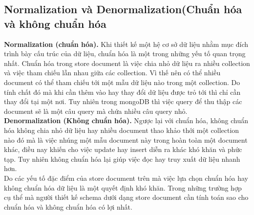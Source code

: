 \subsection{Normalization và Denormalization(Chuẩn hóa và không chuẩn hóa}
\textbf{Normalization (chuẩn hóa).} Khi thiết kế một hệ cơ sở dữ liệu nhằm mục đích trình bày cấu trúc của dữ liệu, chuẩn hóa là một trong những yếu tố quan trọng nhất. Chuẩn hóa trong store document là việc chia nhỏ dữ liệu ra nhiều collection và việc tham chiếu lẫn nhau giữa các collection. Vì thế nên có thể nhiều document có thể tham chiếu tới một mẫu dữ liệu nào trong một collection. Do tính chất đó mà khi cần thêm vào hay thay đổi dữ liệu được trỏ tới thì chỉ cần thay đổi tại một nơi. Tuy nhiên trong mongoDB thì việc query để thu thập các document sẽ là một câu query mà chứa nhiều câu query nhỏ.\\
\textbf{Denormalization (Không chuẩn hóa).} Ngược lại với chuẩn hóa, không chuẩn hóa không chia nhỏ dữ liệu hay nhiều document thao khảo thới một collection nào đó mà là việc nhúng một mẫu document này trong hoàn toàn một document khác, điều nay khiến cho việc update hay insert diễn ra khác khó khăn và phức tạp. Tuy nhiên không chuẩn hóa lại giúp việc đọc hay truy xuất dữ liệu nhanh hơn.\\
Do các yếu tố đặc điểm của store document trên mà việc lựa chọn chuẩn hóa hay không chuẩn hóa dữ liệu là một quyết định khó khăn. Trong những trường hợp cụ thể mà người thiết kế schema dưới dạng store document cần tính toán sao cho chuẩn hóa và không chuẩn hóa có lợi nhất.
